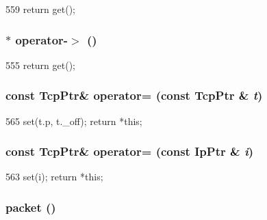 \begin{DoxyCode}
559 { return get(); }
\end{DoxyCode}
\hypertarget{classNet_1_1TcpPtr_a77ed9d83e032caec54b831aabea50dac}{
\subsubsection[{operator-\/$>$}]{$\ast$ operator-\/$>$ ()}}
\label{classNet_1_1TcpPtr_a77ed9d83e032caec54b831aabea50dac}



\begin{DoxyCode}
555 { return get(); }
\end{DoxyCode}
\hypertarget{classNet_1_1TcpPtr_a886897a4af35dd25e1d94e9758f2a635}{
\subsubsection[{operator=}]{\setlength{\rightskip}{0pt plus 5cm}const {\bf TcpPtr}\& operator= (const {\bf TcpPtr} \& {\em t})}}
\label{classNet_1_1TcpPtr_a886897a4af35dd25e1d94e9758f2a635}



\begin{DoxyCode}
565     { set(t.p, t._off); return *this; }
\end{DoxyCode}
\hypertarget{classNet_1_1TcpPtr_a75eaf964740c52e5f7c2274f530dacb3}{
\subsubsection[{operator=}]{\setlength{\rightskip}{0pt plus 5cm}const {\bf TcpPtr}\& operator= (const {\bf IpPtr} \& {\em i})}}
\label{classNet_1_1TcpPtr_a75eaf964740c52e5f7c2274f530dacb3}



\begin{DoxyCode}
563     { set(i); return *this; }
\end{DoxyCode}
\hypertarget{classNet_1_1TcpPtr_a549ac5c293e8047f1be38ca356e160da}{
\subsubsection[{packet}]{ packet ()}}
\label{classNet_1_1TcpPtr_a549ac5c293e8047f1be38ca356e160da}



